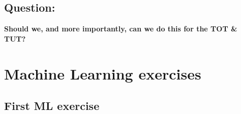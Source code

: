 \documentclass[oneside,11pt]{article}
\begin{document}
\subsection{Question:}

\textbf{Should we, and more importantly, can we do this for the TOT \& TUT?}



\section{Machine Learning exercises}

\subsection{First ML exercise}
\end{document}
